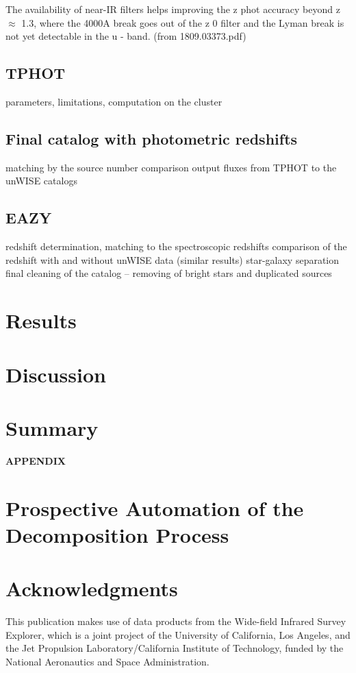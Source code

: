 \documentclass[numberedappendix,apj,twocolumn]{emulateapj}
\begin{document}
The availability of near-IR filters helps improving the
z phot accuracy beyond z $\approx$ 1.3, where the 4000A break goes out
of the z 0 filter and the Lyman break is not yet detectable in the
u - band. (from 1809.03373.pdf)

\subsection{TPHOT} 
	parameters, limitations, computation on the cluster 

\subsection{Final catalog with photometric redshifts} 
	matching by the source number
	comparison output fluxes from TPHOT to the unWISE catalogs

\subsection{EAZY} 
	redshift determination, matching to the spectroscopic redshifts
	comparison of the redshift with and without unWISE data (similar results)
	star-galaxy separation
	final cleaning of the catalog – removing of bright stars and duplicated sources
	
\section{Results}

\section{Discussion}


\section{Summary}


\acknowledgements



%


%

\newpage
\centerline{ {\bf APPENDIX}}
\appendix
\section{Prospective Automation of the Decomposition Process}

\section{Acknowledgments}
This publication makes use of data products from the Wide-field Infrared Survey Explorer, which is a joint project of the University of California, Los Angeles, and the Jet Propulsion Laboratory/California Institute of Technology, funded by the National Aeronautics and Space Administration.
\end{document}
